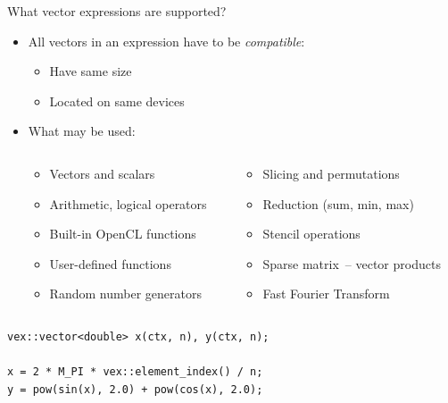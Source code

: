\documentclass[@BEAMER_OPTIONS@]{beamer}
\begin{document}
\begin{frame}[fragile]{What vector expressions are supported?}
    \begin{itemize}
        \item All vectors in an expression have to be \emph{compatible}:
            \begin{itemize}
                \item Have same size
                \item Located on same devices
            \end{itemize}
        \item What may be used:
            \begin{columns}
                \begin{column}{0.42\textwidth}
                    \begin{itemize}
                        \item Vectors and scalars
                        \item Arithmetic, logical operators
                        \item Built-in OpenCL functions
                        \item User-defined functions
                        \item Random number generators
                    \end{itemize}
                \end{column}
                \begin{column}{0.4\textwidth}
                    \begin{itemize}
                        \item Slicing and permutations
                        \item Reduction (sum, min, max)
                        \item Stencil operations
                        \item Sparse matrix~-- vector products
                        \item Fast Fourier Transform
                    \end{itemize}
                \end{column}
            \end{columns}
    \end{itemize}
    \begin{exampleblock}{}
        \begin{lstlisting}
vex::vector<double> x(ctx, n), y(ctx, n);

x = 2 * M_PI * vex::element_index() / n;
y = pow(sin(x), 2.0) + pow(cos(x), 2.0);
        \end{lstlisting}
    \end{exampleblock}
\end{frame}
\end{document}
